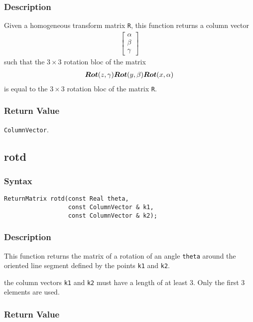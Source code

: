 \documentclass[11pt,fleqn,letterpaper]{report}
\newcommand{\mbold}[1]{\mbox{\boldmath $ #1 $}}
\newcommand{\matr}[2]{\left[\begin{array}{#1} #2 \end{array}\right]}
\begin{document}
\subsubsection*{Description}
Given a homogeneous transform matrix {\tt R}, this function returns a column vector
\begin{eqnarray}
\matr{c}{\alpha \\ \beta \\ \gamma}
\end{eqnarray}
such that the $3 \times 3$ rotation bloc of the matrix
\begin{eqnarray}
\mbold{Rot}(z,\gamma) \mbold{Rot}(y,\beta) \mbold{Rot}(x,\alpha)
\end{eqnarray}
is equal to the $3 \times 3$ rotation bloc of the matrix {\tt R}.


\subsubsection*{Return Value}

{\tt ColumnVector}.

\newpage

\subsection*{rotd}
\subsubsection*{Syntax}
\begin{verbatim}
ReturnMatrix rotd(const Real theta, 
                  const ColumnVector & k1, 
                  const ColumnVector & k2);
\end{verbatim}
\subsubsection*{Description}
This function returns the matrix of a rotation of an angle {\tt theta} around 
the oriented line segment defined by the points {\tt k1} and {\tt k2}.

 the column vectors {\tt k1} and {\tt k2} must have a length of at least 3. 
Only the first 3 elements are used.

\subsubsection*{Return Value}
\end{document}
